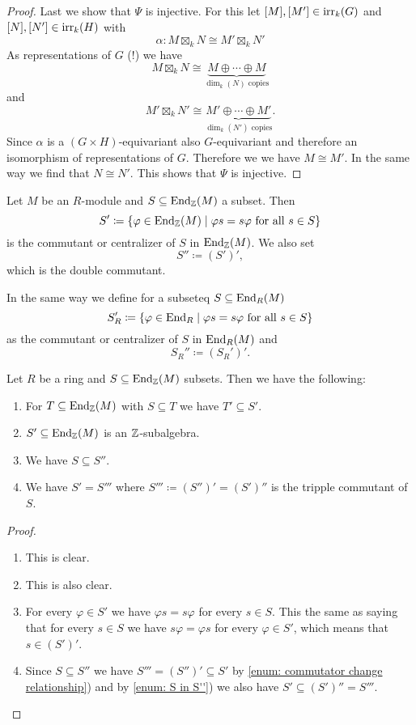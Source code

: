 \begin{proof}
 Last we show that $\Psi$ is injective. For this let $[M], [M'] \in \operatorname{irr}_k(G)$ and $[N], [N'] \in \operatorname{irr}_k(H)$ with
 \[
  \alpha \colon M \boxtimes_k N \cong M' \boxtimes_k N'
 \]
 As representations of $G$ (!) we have
 \[
  M \boxtimes_k N \cong \underbrace{M \oplus \dotsb \oplus M}_{\dim_k(N) \text{ copies}}
 \]
 and
 \[
  M' \boxtimes_k N' \cong \underbrace{M' \oplus \dotsb \oplus M'}_{\dim_k(N') \text{ copies}}.
 \]
 Since $\alpha$ is a $(G \times H)$-equivariant also $G$-equivariant and therefore an isomorphism of representations of $G$. Therefore we we have $M \cong M'$. In the same way we find that $N \cong N'$. This shows that $\Psi$ is injective.
\end{proof}


\begin{defi}
 Let $M$ be an $R$-module and $S \subseteq \operatorname{End}_{\mathbb{Z}}(M)$ a subset. Then
 \[
  S' \coloneqq \{\varphi \in \operatorname{End}_{\mathbb{Z}}(M) \mid \varphi s = s \varphi \text{ for all } s \in S\}
 \]
 is the commutant or centralizer of $S$ in $\operatorname{End}_{\mathbb{Z}}(M)$. We also set
 \[
  S'' \coloneqq (S')',
 \]
 which is the double commutant.
 
 In the same way we define for a subseteq $S \subseteq \operatorname{End}_R(M)$
 \[
  S_R' \coloneqq \{\varphi \in \operatorname{End}_R \mid \varphi s = s \varphi \text{ for all } s \in S\}
 \]
 as the commutant or centralizer of $S$ in $\operatorname{End}_R(M)$ and
 \[
  S_R'' \coloneqq (S_R')'.
 \]
\end{defi}


\begin{lem}
 Let $R$ be a ring and $S \subseteq \operatorname{End}_{\mathbb{Z}}(M)$ subsets. Then we have the following:
 \begin{enumerate}[label=\emph{\alph*})]
  \item\label{enum: commutator change relationship}
  For $T \subseteq \operatorname{End}_{\mathbb{Z}}(M)$ with $S \subseteq T$ we have $T' \subseteq S'$.
  \item
  $S' \subseteq \operatorname{End}_{\mathbb{Z}}(M)$ is an $\mathbb{Z}$-subalgebra.
  \item
  We have $S \subseteq S''$. \label{enum: S in S''}
  \item
  We have $S' = S'''$ where $S''' \coloneqq (S'')' = (S')''$ is the tripple commutant of $S$.
 \end{enumerate}
\end{lem}
\begin{proof}
 \begin{enumerate}[label=\emph{\alph*})]
  \item
   This is clear.
  \item
   This is also clear.
  \item
   For every $\varphi \in S'$ we have $\varphi s = s \varphi$ for every $s \in S$. This the same as saying that for every $s \in S$ we have $s \varphi = \varphi s$ for every $\varphi \in S'$, which means that $s \in (S')'$.
  \item
   Since $S \subseteq S''$ we have $S''' = (S'')' \subseteq S'$ by \ref{enum: commutator change relationship}) and by \ref{enum: S in S''}) we also have $S' \subseteq (S')'' = S'''$.
  \qedhere
 \end{enumerate}
\end{proof}


